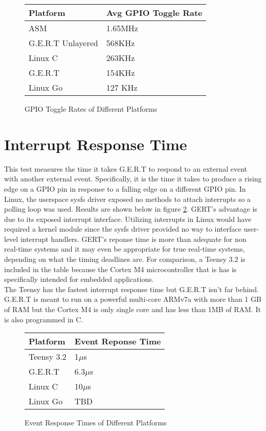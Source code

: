 \begin{figure} [h]
\begin{center}
  \begin{tabular}{ | l | l |}
    \hline
    Platform & Avg GPIO Toggle Rate \\ \hline
    ASM & 1.65MHz \\ \hline
    G.E.R.T Unlayered & 568KHz \\ \hline
    Linux C & 263KHz \\ \hline
    G.E.R.T & 154KHz \\ \hline
    Linux Go & 127 KHz \\
    \hline
  \end{tabular}
\end{center}
  \caption{GPIO Toggle Rates of Different Platforms}  \label{fig:toggle}
\end{figure}


\section{Interrupt Response Time}
This test measures the time it takes G.E.R.T to respond to an external event
with another external event. Specifically, it is the time it takes to produce
a rising edge on a GPIO pin in response to a falling edge on a different GPIO pin.
In Linux, the userspace sysfs driver exposed no methods to attach interrupts
so a polling loop was used. Results are shown below in figure \ref{fig:RT}.
GERT's advantage is due to its exposed interrupt interface. Utilizing interrupts
in Linux would have required a kernel module since the sysfs driver provided
no way to interface user-level interrupt handlers. GERT's reponse time is more
than adequate for non real-time systems and it may even be appropriate for
true real-time systems, depending on what the timing deadlines are. For
comparison, a Teensy 3.2 is included in the table because the Cortex M4
microcontroller that is has is specifically intended for embedded applications. \\


The Teensy has the fastest interrupt response time but G.E.R.T isn't far behind.
G.E.R.T is meant to run on a powerful multi-core ARMv7a with more than 1 GB of RAM but the
Cortex M4 is only single core and has less than 1MB of RAM. It is also
programmed in C.

\begin{figure} [h]
\begin{center}
  \begin{tabular}{ | l | l |}
    \hline
    Platform & Event Reponse Time \\ \hline
    Teensy 3.2 & 1$\mu$s \\ \hline
    G.E.R.T & 6.3$\mu$s \\ \hline
    Linux C & 10$\mu$s \\ \hline
    Linux Go & TBD \\
    \hline
  \end{tabular}
\end{center}
  \caption{Event Response Times of Different Platforms}  \label{fig:RT}
\end{figure}

